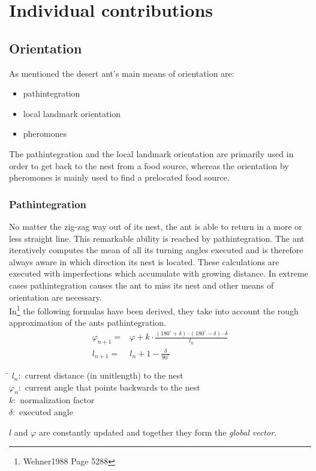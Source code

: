 \documentclass[11pt]{article}
\begin{document}
\newpage
\section{Individual contributions}
\subsection{Orientation}
As mentioned the desert ant's main means of orientation are:
\begin{itemize}
\item pathintegration
\item local landmark orientation
\item pheromones
\end{itemize}
The pathintegration and the local landmark orientation are primarily used in order to get back to the nest from a food source, whereas the orientation by pheromones is mainly used to find a prelocated food source. 

\subsubsection{Pathintegration}
No matter the zig-zag way out of its nest, the ant is able to return in a more or less straight line. This remarkable ability is reached by pathintegration. The ant iteratively computes the mean of all its turning angles executed and is therefore always aware in which direction its nest is located. These calculations are executed with imperfections which accumulate with growing distance. In extreme cases pathintegration causes the ant to miss its nest and other means of orientation are necessary. \\
In\footnote{Wehner1988\cite{Wehner1988} Page 5288} the following formulas have been derived, they take into account the rough approximation of the ants pathintegration. 
\begin{align*}
\varphi_{n+1} =& \varphi +k \cdot \frac{(180^{\circ} + \delta)\cdot(180^{\circ} - \delta)\cdot\delta}{l_{n}} \\
l_{n+1} =& l_{n}+ 1 - \frac{\delta}{90^{\circ}}
\end{align*}
\begin{tabbing}
\hspace{1cm}\=\kill
$l_{n}:$ \> current distance (in unitlength) to the nest \\ 
$\varphi_{n}:$ \> current angle that points backwards to the nest \\ 
$k:$ \>  normalization factor\\ 
$\delta:$ \>  executed angle\\ 
\end{tabbing} 
$l$ and $\varphi$ are constantly updated and together they form the \textit{global vector}.
\end{document}
